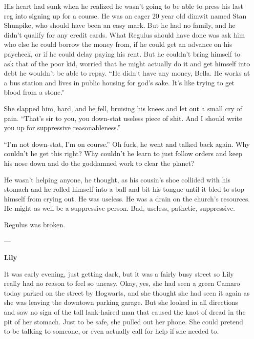 \documentclass[12pt,twoside,openright]{memoir}
\begin{document}
His heart had sunk when he realized he wasn't going to be able to press his last reg into signing up for a course. He was an eager 20 year old dimwit named Stan Shunpike, who should have been an easy mark. But he had no family, and he didn't qualify for any credit cards. What Regulus should have done was ask him who else he could borrow the money from, if he could get an advance on his paycheck, or if he could delay paying his rent. But he couldn't bring himself to ask that of the poor kid, worried that he might actually do it and get himself into debt he wouldn't be able to repay. ``He didn't have any money, Bella. He works at a bus station and lives in public housing for god's sake. It's like trying to get blood from a stone.''

She slapped him, hard, and he fell, bruising his knees and let out a small cry of pain. ``That's sir to you, you down-stat useless piece of shit. And I should write you up for suppressive reasonableness.''

``I'm not down-stat, I'm on course.'' Oh fuck, he went and talked back again. Why couldn't he get this right? Why couldn't he learn to just follow orders and keep his nose down and do the goddamned work to clear the planet?

He wasn't helping anyone, he thought, as his cousin's shoe collided with his stomach and he rolled himself into a ball and bit his tongue until it bled to stop himself from crying out. He was useless. He was a drain on the church's resources. He might as well be a suppressive person. Bad, useless, pathetic, suppressive.

Regulus was broken.

---

\textbf{Lily} 

It was early evening, just getting dark, but it was a fairly busy street so Lily really had no reason to feel so uneasy. Okay, yes, she had seen a green Camaro today parked on the street by Hogwarts, and she thought she had seen it again as she was leaving the downtown parking garage. But she looked in all directions and saw no sign of the tall lank-haired man that caused the knot of dread in the pit of her stomach. Just to be safe, she pulled out her phone. She could pretend to be talking to someone, or even actually call for help if she needed to.
\end{document}
